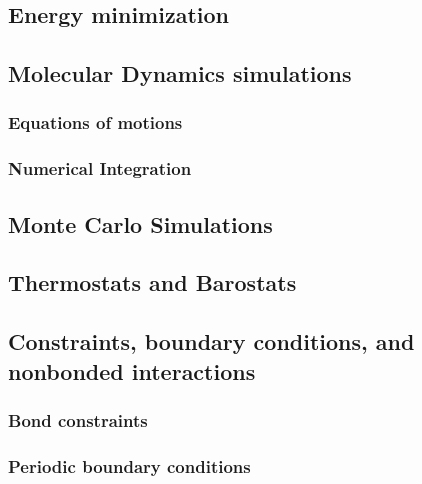 \subsection{Energy minimization}

\lipsum[1][1-3]

\subsection{Molecular Dynamics simulations}

\lipsum[1][1-3]

\subsubsection{Equations of motions} %

\lipsum[1][1-3]

\subsubsection{Numerical Integration}

\lipsum[1][1-3]

\subsection{Monte Carlo Simulations}
\lipsum[1][1-3]

\subsection{Thermostats and Barostats}

\lipsum[1][1-3]

\subsection{Constraints, boundary conditions, and nonbonded interactions}

\lipsum[1][1-3]

\subsubsection{Bond constraints}

\lipsum[1][1-3]

\subsubsection{Periodic boundary conditions}


